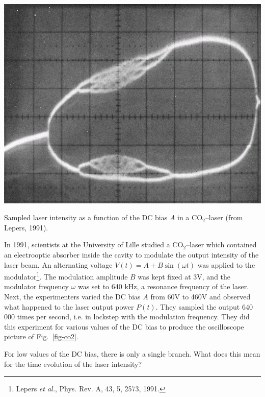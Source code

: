 \begin{marginfigure}
\centering
\includegraphics{dynamic/figures/CO2_chaos}
\caption{Sampled laser intensity as a function of the DC bias $A$ in a CO$_2$--laser (from Lepers, 1991).}
\label{fig-co2}
\end{marginfigure}

In 1991, scientists at the University of Lille studied a CO$_2$--laser which contained an electrooptic absorber inside the cavity to modulate the output intensity of the laser beam. An alternating voltage $V(t)=A+B \sin (\omega t)$ was applied to the modulator\footnote{Lepers \emph{et al.}, Phys. Rev. A, 43, 5, 2573, 1991.}. The modulation amplitude $B$ was kept fixed at 3V, and the modulator frequency $\omega$ was set to 640 kHz, a resonance frequency of the laser. Next, the experimenters varied the DC bias $A$ from 60V to 460V and observed what happened to the laser output power $P(t)$. They sampled the output 640 000 times per second, i.e. in lockstep with the modulation frequency. They did this experiment for various values of the DC bias to produce the oscilloscope picture of Fig.~\ref{fig-co2}.

\begin{cue}
For low values of the DC bias, there is only a single branch. What does this mean for the time evolution of the laser intensity?
\end{cue}

